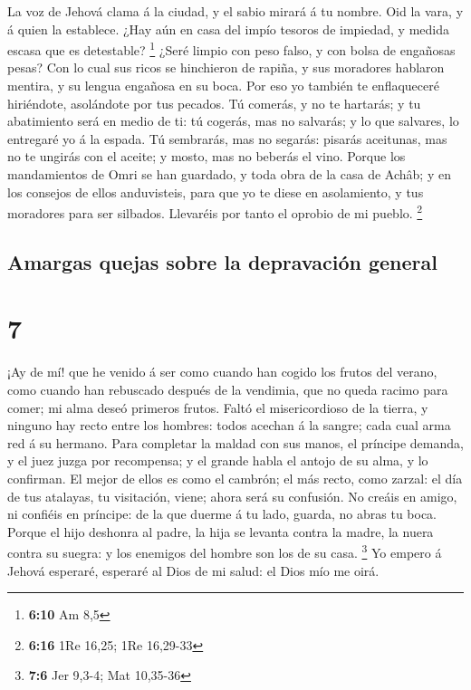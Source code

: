  La voz de Jehová clama á la ciudad, y el sabio mirará á
tu nombre. Oid la vara, y á quien la establece.  ¿Hay aún
en casa del impío tesoros de impiedad, y medida escasa que es
detestable? \footnote{\textbf{6:10} Am 8,5}  ¿Seré limpio
con peso falso, y con bolsa de engañosas pesas?  Con lo
cual sus ricos se hinchieron de rapiña, y sus moradores hablaron
mentira, y su lengua engañosa en su boca.  Por eso yo
también te enflaqueceré hiriéndote, asolándote por tus pecados.
 Tú comerás, y no te hartarás; y tu abatimiento será en
medio de ti: tú cogerás, mas no salvarás; y lo que salvares, lo
entregaré yo á la espada.  Tú sembrarás, mas no segarás:
pisarás aceitunas, mas no te ungirás con el aceite; y mosto, mas no
beberás el vino.  Porque los mandamientos de Omri se han
guardado, y toda obra de la casa de Achâb; y en los consejos de ellos
anduvisteis, para que yo te diese en asolamiento, y tus moradores para
ser silbados. Llevaréis por tanto el oprobio de mi pueblo. \footnote{\textbf{6:16}
  1Re 16,25; 1Re 16,29-33}

\hypertarget{amargas-quejas-sobre-la-depravaciuxf3n-general}{%
\subsection{Amargas quejas sobre la depravación
general}\label{amargas-quejas-sobre-la-depravaciuxf3n-general}}

\hypertarget{section-6}{%
\section{7}\label{section-6}}

 ¡Ay de mí! que he venido á ser como cuando han cogido los
frutos del verano, como cuando han rebuscado después de la vendimia, que
no queda racimo para comer; mi alma deseó primeros frutos.
 Faltó el misericordioso de la tierra, y ninguno hay recto
entre los hombres: todos acechan á la sangre; cada cual arma red á su
hermano.  Para completar la maldad con sus manos, el
príncipe demanda, y el juez juzga por recompensa; y el grande habla el
antojo de su alma, y lo confirman.  El mejor de ellos es
como el cambrón; el más recto, como zarzal: el día de tus atalayas, tu
visitación, viene; ahora será su confusión.  No creáis en
amigo, ni confiéis en príncipe: de la que duerme á tu lado, guarda, no
abras tu boca.  Porque el hijo deshonra al padre, la hija
se levanta contra la madre, la nuera contra su suegra: y los enemigos
del hombre son los de su casa. \footnote{\textbf{7:6} Jer 9,3-4; Mat
  10,35-36}  Yo empero á Jehová esperaré, esperaré al Dios
de mi salud: el Dios mío me oirá.

